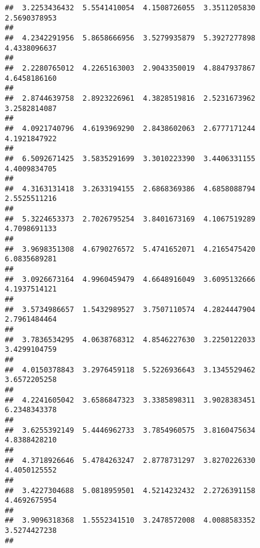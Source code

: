 \documentclass[]{article}
\begin{document}
\begin{verbatim}
##  3.2253436432  5.5541410054  4.1508726055  3.3511205830  2.5690378953 
##                                                                       
##  4.2342291956  5.8658666956  3.5279935879  5.3927277898  4.4338096637 
##                                                                       
##  2.2280765012  4.2265163003  2.9043350019  4.8847937867  4.6458186160 
##                                                                       
##  2.8744639758  2.8923226961  4.3828519816  2.5231673962  3.2582814087 
##                                                                       
##  4.0921740796  4.6193969290  2.8438602063  2.6777171244  4.1921847922 
##                                                                       
##  6.5092671425  3.5835291699  3.3010223390  3.4406331155  4.4009834705 
##                                                                       
##  4.3163131418  3.2633194155  2.6868369386  4.6858088794  2.5525511216 
##                                                                       
##  5.3224653373  2.7026795254  3.8401673169  4.1067519289  4.7098691133 
##                                                                       
##  3.9698351308  4.6790276572  5.4741652071  4.2165475420  6.0835689281 
##                                                                       
##  3.0926673164  4.9960459479  4.6648916049  3.6095132666  4.1937514121 
##                                                                       
##  3.5734986657  1.5432989527  3.7507110574  4.2824447904  2.7961484464 
##                                                                       
##  3.7836534295  4.0638768312  4.8546227630  3.2250122033  3.4299104759 
##                                                                       
##  4.0150378843  3.2976459118  5.5226936643  3.1345529462  3.6572205258 
##                                                                       
##  4.2241605042  3.6586847323  3.3385898311  3.9028383451  6.2348343378 
##                                                                       
##  3.6255392149  5.4446962733  3.7854960575  3.8160475634  4.8388428210 
##                                                                       
##  4.3718926646  5.4784263247  2.8778731297  3.8270226330  4.4050125552 
##                                                                       
##  3.4227304688  5.0818959501  4.5214232432  2.2726391158  4.4692675954 
##                                                                       
##  3.9096318368  1.5552341510  3.2478572008  4.0088583352  3.5274427238 
##                                                                       

\end{verbatim}
\end{document}
